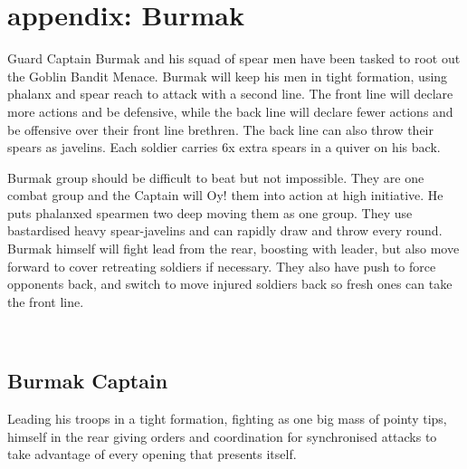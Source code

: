 \section*{appendix: Burmak}
\label{appendixburmak}

Guard Captain Burmak and his squad of spear men have been tasked to root out the Goblin Bandit Menace. Burmak will keep his men in tight formation, using phalanx and spear reach to attack with a second line. The front line will declare more actions and be defensive, while the back line will declare fewer actions and be offensive over their front line brethren. The back line can also throw their spears as javelins. Each soldier carries 6x extra spears in a quiver on his back.

Burmak group should be difficult to beat but not impossible. They are one combat group and the Captain will Oy! them into action at high initiative. He puts phalanxed spearmen two deep moving them as one group. They use bastardised heavy spear-javelins and can rapidly draw and throw every round. Burmak himself will fight lead from the rear, boosting with leader, but also move forward to cover retreating soldiers if necessary. They also have push to force opponents back, and switch to move injured soldiers back so fresh ones can take the front line.

\


\subsection*{Burmak Captain}

Leading his troops in a tight formation, fighting as one big mass of pointy tips, himself in the rear giving orders and coordination for synchronised attacks to take advantage of every opening that presents itself.

\

